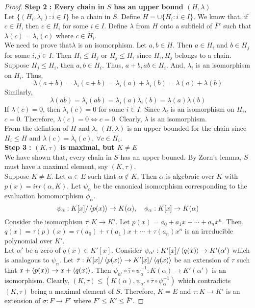 \begin{proof}
	\textbf{Step 2 : Every chain in $S$ has an upper bound $(H,\lambda)$}\\
	Let $\{ (H_i,\lambda_i) : i \in I \}$ be a chain in $S$.
	Define $\displaystyle H = \cup \{H_i : i \in I\}$.
	We know that, if $c \in H$, then $c \in H_i$ for some $i \in I$.
	Define $\lambda$ from $H$ onto a subfield of $\bar{F}'$ such that $\lambda(c) = \lambda_i(c)$ where $ c \in H_i$.\\

	We need to prove that$\lambda$ is an isomorphism.
	Let $a,b \in H$.
	Then $a \in H_i$ and $b \in H_j$ for some $i,j \in I$.
	Then $H_i \le H_j$ or $H_j \le H_i$ since $H_i,H_j$ belongs to a chain.
	Suppose $H_j \le H_i$, then $a,b \in H_i$.
	Thus, $a+b,ab \in H_i$.
	And, $\lambda_i$ is an isomorphism on $H_i$.
	Thus,
	\[ \lambda(a+b) = \lambda_i(a + b) = \lambda_i(a) + \lambda_i(b) = \lambda(a) + \lambda(b) \]
	Similarly,
	\[ \lambda(ab) = \lambda_i(ab) = \lambda_i(a)\lambda_i(b) = \lambda(a)\lambda(b) \]
	If $\lambda(c) = 0$, then $\lambda_i(c) = 0$ for some $i \in I$.
	Since $\lambda_i$ is an isomorphism on $H_i$, $c = 0$.
	Therefore, $\lambda(c) = 0 \iff c = 0$.
	Clearly, $\lambda$ is an isomorphism.\\

	From the defintion of $H$ and $\lambda$, $(H,\lambda)$ is an upper bounded for the chain since $H_i \le H$ and $\lambda(c) = \lambda_i(c),\ \forall c \in H_i$.\\

	\textbf{Step 3 : $(K,\tau)$ is maximal, but $K \ne E$}\\
	We have shown that, every chain in $S$ has an upper bouned.
	By Zorn's lemma, $S$ must have a maximal element, say $(K,\tau)$.\\

	Suppose $K \ne E$.
	Let $\alpha \in E$ such that $\alpha \notin K$.
	Then $\alpha$ is algebraic over $K$ with $p(x) = irr(\alpha,K)$.
	Let $\psi_\alpha$ be the canonical isomorphism corresponding to the evaluation homomorphism $\phi_\alpha$.
	\[ \psi_\alpha : K[x]/\left\langle p(x)\right\rangle \to K(\alpha),\quad \phi_\alpha : K[x] \to K(\alpha) \]
	Consider the isomorphism $\tau : K \to K'$.
	Let $p(x) = a_0 + a_1 x + \dotsb + a_nx^n$.
	Then, $q(x) = \tau(p)(x) = \tau(a_0) + \tau(a_1) x + \dotsb + \tau(a_n)x^n$ is an irreducible polynomial over $K'$.\\

	Let $\alpha'$ be a zero of $q(x) \in K'[x]$.
	Consider $\psi_{\alpha'} : K'[x]/\left\langle q(x)\right\rangle \to K'(\alpha')$ which is analogous to $\psi_\alpha$.
	Let $\bar{\tau} : K[x]/\left\langle p(x)\right\rangle \to K'[x]/\left\langle q(x)\right\rangle$ be an extension of $\tau$ such that $x+\left\langle p(x)\right\rangle \to x+\left\langle q(x)\right\rangle$.
	Then $\psi_{\alpha'} \circ \bar{\tau} \circ \psi_\alpha^{-1} : K(\alpha) \to K'(\alpha')$ is an isomorphism.
	Clearly, $(K,\tau) \leq \left(K(\alpha),\psi_{\alpha'} \circ \bar{\tau} \circ \psi_{\alpha}^{-1}\right)$ which contradicts $(K,\tau)$ being a maximal element of $S$.
	Therefore, $K = E$ and $\tau : K \to K'$ is an extension of $\sigma : F \to F'$ where $F' \le K' \le \bar{F}'$.
\end{proof}


